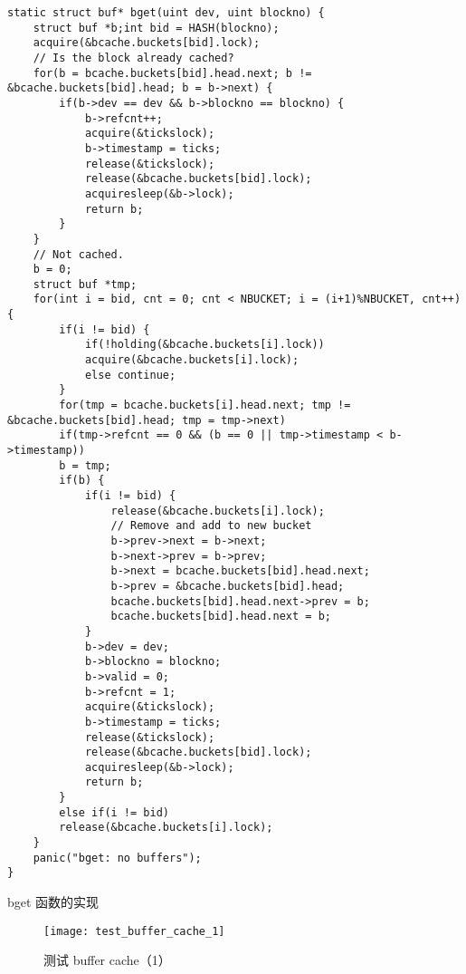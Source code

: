 \begin{listing}[!htb]
	\begin{verbatim}
static struct buf* bget(uint dev, uint blockno) {
    struct buf *b;int bid = HASH(blockno);
    acquire(&bcache.buckets[bid].lock);
    // Is the block already cached?
    for(b = bcache.buckets[bid].head.next; b != &bcache.buckets[bid].head; b = b->next) {
        if(b->dev == dev && b->blockno == blockno) {
            b->refcnt++;
            acquire(&tickslock);
            b->timestamp = ticks;
            release(&tickslock);           
            release(&bcache.buckets[bid].lock);
            acquiresleep(&b->lock);
            return b;
        }
    }
    // Not cached.
    b = 0;
    struct buf *tmp;    
    for(int i = bid, cnt = 0; cnt < NBUCKET; i = (i+1)%NBUCKET, cnt++) {
        if(i != bid) {
            if(!holding(&bcache.buckets[i].lock))
            acquire(&bcache.buckets[i].lock);
            else continue;
        }          
        for(tmp = bcache.buckets[i].head.next; tmp != &bcache.buckets[bid].head; tmp = tmp->next)
        if(tmp->refcnt == 0 && (b == 0 || tmp->timestamp < b->timestamp))
        b = tmp;
        if(b) {
            if(i != bid) {
                release(&bcache.buckets[i].lock);
                // Remove and add to new bucket
                b->prev->next = b->next;
                b->next->prev = b->prev;
                b->next = bcache.buckets[bid].head.next;
                b->prev = &bcache.buckets[bid].head;
                bcache.buckets[bid].head.next->prev = b;
                bcache.buckets[bid].head.next = b;
            }           
            b->dev = dev;
            b->blockno = blockno;
            b->valid = 0;
            b->refcnt = 1;        
            acquire(&tickslock);
            b->timestamp = ticks;
            release(&tickslock);  
            release(&bcache.buckets[bid].lock);
            acquiresleep(&b->lock);
            return b;
        }
        else if(i != bid)
        release(&bcache.buckets[i].lock); 
    }
    panic("bget: no buffers");
}
	\end{verbatim}
	\caption{bget 函数的实现}\label{lst:bget}
\end{listing}

\begin{figure}[!htb]
	\centering
	\texttt{[image: test\_buffer\_cache\_1]}
	\caption{测试 buffer cache（1）}
	\label{fig:test_buffer_cache_1}
\end{figure}

